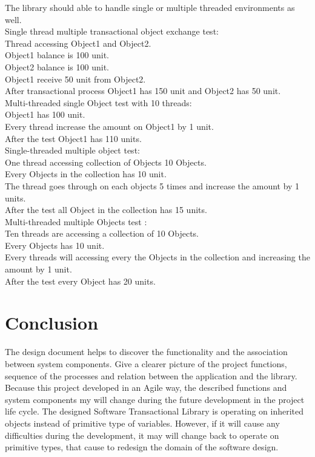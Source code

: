 \documentclass[12pt]{article}
\begin{document}
{\setlength{\parindent}{0cm}
The library should able to handle single or multiple threaded environments as well.\\

Single thread multiple transactional object exchange test:\\
Thread accessing Object1 and Object2.\\
Object1 balance is 100 unit.\\
Object2 balance is 100 unit.\\
Object1 receive 50 unit from Object2.\\
After transactional process Object1 has 150 unit and Object2 has 50 unit.\\

Multi-threaded single Object test with 10 threads:\\
Object1 has 100 unit.\\
Every thread increase the amount on Object1 by 1 unit.\\
After the test Object1 has 110 units.\\

Single-threaded multiple object test:\\
One thread accessing collection of Objects 10 Objects.\\
Every Objects in the collection has 10 unit.\\
The thread goes through on each objects 5 times and increase the amount by 1 units.\\
After the test all Object in the collection has 15 units.  \\

Multi-threaded multiple Objects test :\\
Ten threads are  accessing a collection of 10 Objects.\\
Every Objects has 10 unit.\\
Every threads will accessing every the Objects in the collection and increasing the amount by 1 unit.\\
After the test every Object has 20 units.    


}






\section{Conclusion}
The design document helps to discover the functionality and the association between system components. Give a clearer picture of the project functions, sequence of the processes and relation between the application and the library.\\

Because this project developed in an Agile way, the described functions and system components my will change during the future development in the project life cycle. The designed Software Transactional Library is operating on inherited objects instead of primitive type of variables. However, if it will cause any difficulties during the development, it may will change back to operate on primitive types, that cause to redesign the domain of the software design.  
\end{document}

